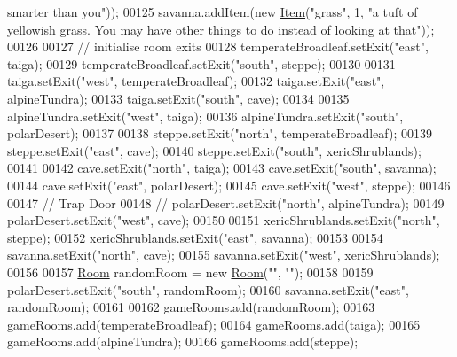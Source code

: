 \begin{DoxyCode}
{       smarter than you"}));
00125         savanna.addItem(\textcolor{keyword}{new} \hyperlink{classpkg__world_1_1Item}{Item}(\textcolor{stringliteral}{"grass"}, 1, \textcolor{stringliteral}{"a tuft of yellowish grass. You may have other things to
       do instead of looking at that"}));
00126 
00127         \textcolor{comment}{// initialise room exits}
00128         temperateBroadleaf.setExit(\textcolor{stringliteral}{"east"}, taiga);
00129         temperateBroadleaf.setExit(\textcolor{stringliteral}{"south"}, steppe);
00130 
00131         taiga.setExit(\textcolor{stringliteral}{"west"}, temperateBroadleaf);
00132         taiga.setExit(\textcolor{stringliteral}{"east"}, alpineTundra);
00133         taiga.setExit(\textcolor{stringliteral}{"south"}, cave);
00134 
00135         alpineTundra.setExit(\textcolor{stringliteral}{"west"}, taiga);
00136         alpineTundra.setExit(\textcolor{stringliteral}{"south"}, polarDesert);
00137 
00138         steppe.setExit(\textcolor{stringliteral}{"north"}, temperateBroadleaf);
00139         steppe.setExit(\textcolor{stringliteral}{"east"}, cave);
00140         steppe.setExit(\textcolor{stringliteral}{"south"}, xericShrublands);
00141 
00142         cave.setExit(\textcolor{stringliteral}{"north"}, taiga);
00143         cave.setExit(\textcolor{stringliteral}{"south"}, savanna);
00144         cave.setExit(\textcolor{stringliteral}{"east"}, polarDesert);
00145         cave.setExit(\textcolor{stringliteral}{"west"}, steppe);
00146 
00147         \textcolor{comment}{// Trap Door}
00148         \textcolor{comment}{// polarDesert.setExit("north", alpineTundra);}
00149         polarDesert.setExit(\textcolor{stringliteral}{"west"}, cave);
00150 
00151         xericShrublands.setExit(\textcolor{stringliteral}{"north"}, steppe);
00152         xericShrublands.setExit(\textcolor{stringliteral}{"east"}, savanna);
00153 
00154         savanna.setExit(\textcolor{stringliteral}{"north"}, cave);
00155         savanna.setExit(\textcolor{stringliteral}{"west"}, xericShrublands);
00156 
00157         \hyperlink{classpkg__world_1_1Room}{Room} randomRoom = \textcolor{keyword}{new} \hyperlink{classpkg__world_1_1Room}{Room}(\textcolor{stringliteral}{""}, \textcolor{stringliteral}{""});
00158 
00159         polarDesert.setExit(\textcolor{stringliteral}{"south"}, randomRoom);
00160         savanna.setExit(\textcolor{stringliteral}{"east"}, randomRoom);
00161 
00162         gameRooms.add(randomRoom);
00163         gameRooms.add(temperateBroadleaf);
00164         gameRooms.add(taiga);
00165         gameRooms.add(alpineTundra);
00166         gameRooms.add(steppe);

\end{DoxyCode}
